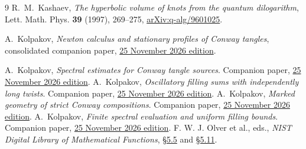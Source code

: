\documentclass[11pt]{article}
\numberwithin{equation}{section}
\begin{document}
\begin{thebibliography}{9}
R.~M.~Kashaev, \emph{The hyperbolic volume of knots from the quantum
dilogarithm}, Lett. Math. Phys. \textbf{39} (1997), 269--275,
\href{https://arxiv.org/abs/q-alg/9601025}{arXiv:q-alg/9601025}.

A.~Kolpakov, \emph{Newton calculus and stationary profiles of Conway tangles},
consolidated companion paper,
\href{https://github.com/sashakolpakov/murakamis_dream/blob/conway-series-2026-11-25/docs/papers/newton-calculus.pdf}{25 November 2026 edition}.

A.~Kolpakov, \emph{Spectral estimates for Conway tangle sources}.
Companion paper, \href{https://github.com/sashakolpakov/murakamis_dream/blob/conway-series-2026-11-25/docs/papers/conway-source-bounds.pdf}{25 November 2026 edition}.
A.~Kolpakov, \emph{Oscillatory filling sums with independently long twists}.
Companion paper, \href{https://github.com/sashakolpakov/murakamis_dream/blob/conway-series-2026-11-25/docs/papers/oscillatory-fillings.pdf}{25 November 2026 edition}.
A.~Kolpakov, \emph{Marked geometry of strict Conway compositions}.
Companion paper, \href{https://github.com/sashakolpakov/murakamis_dream/blob/conway-series-2026-11-25/docs/papers/strict-conway-geometry.pdf}{25 November 2026 edition}.
A.~Kolpakov, \emph{Finite spectral evaluation and uniform filling bounds}.
Companion paper, \href{https://github.com/sashakolpakov/murakamis_dream/blob/conway-series-2026-11-25/docs/papers/filling-bounds.pdf}{25 November 2026 edition}.
 F. W. J. Olver et al., eds., \emph{NIST Digital Library of Mathematical Functions}, \href{https://dlmf.nist.gov/5.5}{\S5.5} and \href{https://dlmf.nist.gov/5.11}{\S5.11}.
\end{thebibliography}
\end{document}
